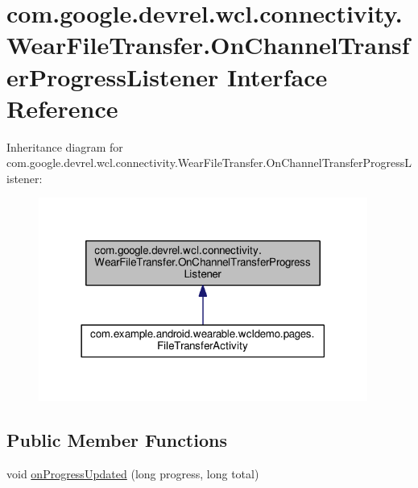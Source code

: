 \hypertarget{interfacecom_1_1google_1_1devrel_1_1wcl_1_1connectivity_1_1WearFileTransfer_1_1OnChannelTransferProgressListener}{}\section{com.\+google.\+devrel.\+wcl.\+connectivity.\+Wear\+File\+Transfer.\+On\+Channel\+Transfer\+Progress\+Listener Interface Reference}
\label{interfacecom_1_1google_1_1devrel_1_1wcl_1_1connectivity_1_1WearFileTransfer_1_1OnChannelTransferProgressListener}


Inheritance diagram for com.\+google.\+devrel.\+wcl.\+connectivity.\+Wear\+File\+Transfer.\+On\+Channel\+Transfer\+Progress\+Listener\+:
\nopagebreak
\begin{figure}[H]
\begin{center}
\leavevmode
\includegraphics[width=306pt]{d2/d78/interfacecom_1_1google_1_1devrel_1_1wcl_1_1connectivity_1_1WearFileTransfer_1_1OnChannelTransferee334040cc0a0e341d6828f13224ccb2}
\end{center}
\end{figure}
\subsection*{Public Member Functions}
\begin{DoxyCompactItemize}
\item 
void \hyperlink{interfacecom_1_1google_1_1devrel_1_1wcl_1_1connectivity_1_1WearFileTransfer_1_1OnChannelTransferProgressListener_ac7194a322966748546de79aa32b61f22}{on\+Progress\+Updated} (long progress, long total)
\end{DoxyCompactItemize}


